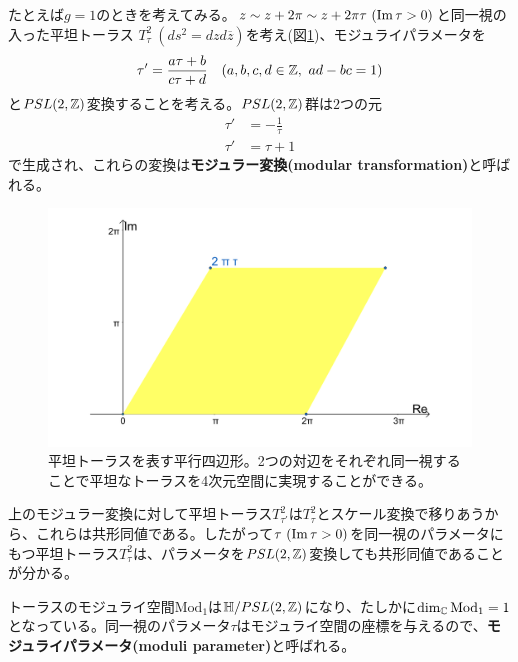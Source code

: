 \begin{ex}
たとえば$g=1$のときを考えてみる。$z\sim z+2\pi \sim z+2\pi\tau\ (\IM\tau>0)$と同一視の入った平坦トーラス $T_\tau^2\  (ds^2=dzd\overline{z})$を考え(図\ref{fig:flattorus})、モジュライパラメータを
\begin{align}
\tau' = \frac{a\tau+b}{c\tau+d}\quad (a,b,c,d\in \mathbb{Z},\  ad-bc=1)
\end{align}
と$PSL(2,\mathbb{Z})$変換することを考える。$PSL(2,\mathbb{Z})$群は$2$つの元
\begin{align}
\tau'&= -\frac{1}{\tau}\\
\tau'&= \tau+1
\end{align}
で生成され、これらの変換は\textbf{モジュラー変換(modular transformation)}と呼ばれる。
\begin{figure}[h]
	\centering
	\includegraphics[width=0.7\linewidth]{flattorus.pdf}
	\caption{平坦トーラスを表す平行四辺形。2つの対辺をそれぞれ同一視することで平坦なトーラスを4次元空間に実現することができる。}
	\label{fig:flattorus}
\end{figure}

上のモジュラー変換に対して平坦トーラス$T_{\tau'}^2$は$T_{\tau}^2$とスケール変換で移りあうから、これらは共形同値である。したがって$\tau\ (\IM\tau>0)$を同一視のパラメータにもつ平坦トーラス$T_{\tau}^2$は、パラメータを$PSL(2,\mathbb{Z})$変換しても共形同値であることが分かる。

トーラスのモジュライ空間$\text{Mod}_1$は$\mathbb{H}/PSL(2,\mathbb{Z})$になり、たしかに$\dim_{\mathbb{C}} \text{Mod}_1=1$となっている。同一視のパラメータ$\tau$はモジュライ空間の座標を与えるので、\textbf{モジュライパラメータ(moduli parameter)}と呼ばれる。
\end{ex}

